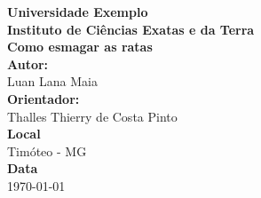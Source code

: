 \documentclass[12pt,a4]{article}
\begin{document}
    \begin{titlepage}
        \begin{center}

            \textbf{\Large Universidade Exemplo}\\[0.5cm]
            \textbf{\large Instituto de Ciências Exatas e da Terra}\\[7cm]

            \textbf{\large Como esmagar as ratas}\\[4cm]

            \textbf{\large Autor:}\\
            Luan Lana Maia\\[1cm]

            \textbf{\large Orientador:}\\
            Thalles Thierry de Costa Pinto\\[1cm]

            \textbf{\large Local}\\
            Timóteo - MG\\[1cm]

            \textbf{\large Data}\\
            \today

            \vfill

        \end{center}
    \end{titlepage}
\end{document}
